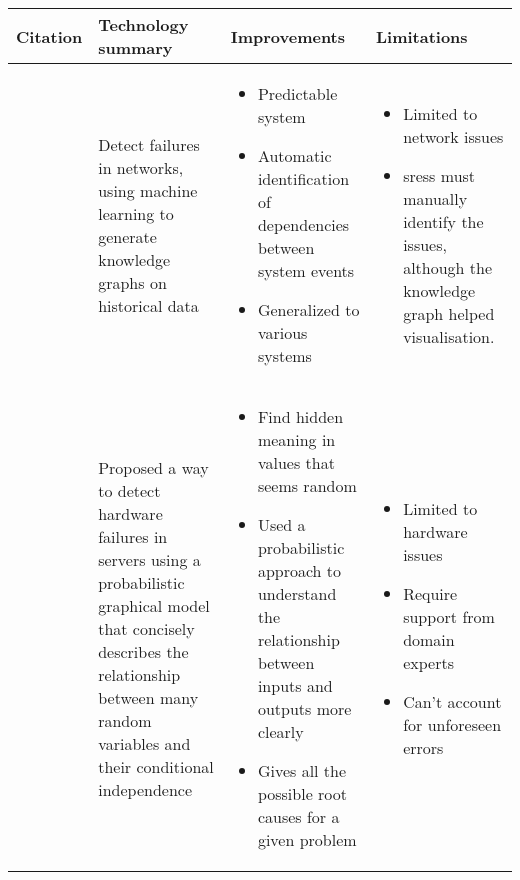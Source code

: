\begin{longtable}{| p{20mm} | p{40mm} | p{43mm} | p{46mm} |}
\hline
  \textbf{Citation} &
  \textbf{Technology summary} &
  \textbf{Improvements} &
  \textbf{Limitations} \\ \hline


  \cite{gonzalez2017root} &
  Detect failures in networks, using machine learning to generate knowledge graphs on historical data &
  \vspace{-8mm}
  \begin{itemize}[leftmargin=*,noitemsep,nolistsep] 
    \item Predictable system
    \item Automatic identification of dependencies between system events
    \item Generalized to various systems
  \vspace{-7mm}
  \end{itemize} &
  \vspace{-8mm}
  \begin{itemize}[leftmargin=*,noitemsep,nolistsep] 
    \item Limited to network issues
    \item \acp{sres} must manually identify the issues, although the knowledge graph helped visualisation.
  \vspace{-7mm}
  \end{itemize} \\ \hline


  \cite{chigurupati2017root} &
  Proposed a way to detect hardware failures in servers using a probabilistic graphical model that concisely describes the relationship between many random variables and their conditional independence &
  \vspace{-8mm}
  \begin{itemize}[leftmargin=*,noitemsep,nolistsep] 
    \item Find hidden meaning in values that seems random
    \item Used a probabilistic approach to understand the relationship between inputs and outputs more clearly
    \item Gives all the possible root causes for a given problem
  \vspace{-7mm}
  \end{itemize} &
  \vspace{-8mm}
  \begin{itemize}[leftmargin=*,noitemsep,nolistsep] 
    \item Limited to hardware issues
    \item Require support from domain experts
    \item Can't account for unforeseen errors
  \vspace{-7mm}
  \end{itemize} \\ \hline



\end{longtable}
